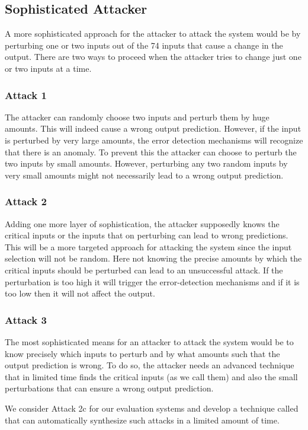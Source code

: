 \subsection{Sophisticated Attacker}
A more sophisticated approach for the attacker to attack the system would be by perturbing one or two inputs out of the 74 inputs that cause a change in the output. There are two ways to proceed when the attacker tries to change just one or two inputs at a time. 

\subsubsection{Attack 1}
The attacker can randomly choose two inputs and perturb them by huge amounts. This will indeed cause a wrong output prediction. However, if the input is perturbed by very large amounts, the error detection mechanisms will recognize that there is an anomaly. To prevent this the attacker can choose to perturb the two inputs by small amounts. However, perturbing any two random inputs by very small amounts might not necessarily lead to a wrong output prediction.

\subsubsection{Attack 2}
Adding one more layer of sophistication, the attacker supposedly knows the critical inputs or the inputs that on perturbing can lead to wrong predictions. This will be a more targeted approach for attacking the system since the input selection will not be random. Here not knowing the precise amounts by which the critical inputs should be perturbed can lead to an unsuccessful attack. If the perturbation is too high it will trigger the error-detection mechanisms and if it is too low then it will not affect the output. 
\subsubsection{Attack 3}
The most sophisticated means for an attacker to attack the system would be to know precisely which inputs to perturb and by what amounts such that the output prediction is wrong. To do so, the attacker needs an advanced technique that in limited time finds the critical inputs (as we call them) and also the small perturbations that can ensure a wrong output prediction. 

We consider Attack 2c for our evaluation systems and develop a technique called \tool that can automatically synthesize such attacks in a limited amount of time. 



